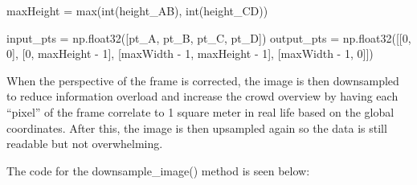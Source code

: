 \documentclass[
]{article}
\newenvironment{Shaded}{\begin{snugshade}}{\end{snugshade}}
\newcommand{\BuiltInTok}[1]{\textcolor[rgb]{0.00,0.23,0.31}{#1}}
\newcommand{\DecValTok}[1]{\textcolor[rgb]{0.68,0.00,0.00}{#1}}
\newcommand{\NormalTok}[1]{\textcolor[rgb]{0.00,0.23,0.31}{#1}}
\newcommand{\OperatorTok}[1]{\textcolor[rgb]{0.37,0.37,0.37}{#1}}
\begin{document}
\begin{Shaded}
\begin{Highlighting}[]
\NormalTok{  maxHeight }\OperatorTok{=} \BuiltInTok{max}\NormalTok{(}\BuiltInTok{int}\NormalTok{(height\_AB), }\BuiltInTok{int}\NormalTok{(height\_CD))}

\NormalTok{  input\_pts }\OperatorTok{=}\NormalTok{ np.float32([pt\_A, pt\_B, pt\_C, pt\_D])}
\NormalTok{  output\_pts }\OperatorTok{=}\NormalTok{ np.float32([[}\DecValTok{0}\NormalTok{, }\DecValTok{0}\NormalTok{],}
\NormalTok{                          [}\DecValTok{0}\NormalTok{, maxHeight }\OperatorTok{{-}} \DecValTok{1}\NormalTok{],}
\NormalTok{                          [maxWidth }\OperatorTok{{-}} \DecValTok{1}\NormalTok{, maxHeight }\OperatorTok{{-}} \DecValTok{1}\NormalTok{],}
\NormalTok{                          [maxWidth }\OperatorTok{{-}} \DecValTok{1}\NormalTok{, }\DecValTok{0}\NormalTok{]])}
\end{Highlighting}
\end{Shaded}

When the perspective of the frame is corrected, the image is then
downsampled to reduce information overload and increase the crowd
overview by having each ``pixel'' of the frame correlate to 1 square
meter in real life based on the global coordinates. After this, the
image is then upsampled again so the data is still readable but not
overwhelming.

The code for the downsample\_image() method is seen below:
\end{document}
